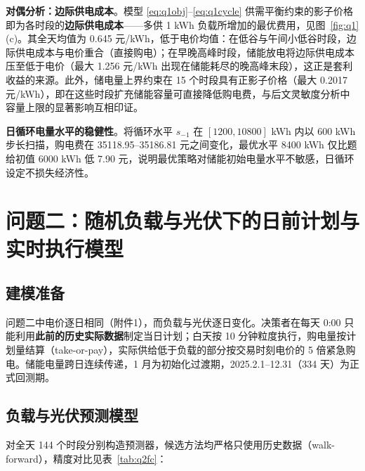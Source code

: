\documentclass[zihao=-4,a4paper,UTF8,fontset=none]{ctexart}
\begin{document}
\textbf{对偶分析：边际供电成本}。模型 \eqref{eq:q1obj}--\eqref{eq:q1cycle} 供需平衡约束的影子价格即为各时段的\textbf{边际供电成本}——多供 1 kWh 负载所增加的最优费用，见图~\ref{fig:q1}(c)。其全天均值为 0.645 元/kWh，低于电价均值：在低谷与午间小低谷时段，边际供电成本与电价重合（直接购电）；在早晚高峰时段，储能放电将边际供电成本压至低于电价（最大 1.256 元/kWh 出现在储能耗尽的晚高峰末段），这正是套利收益的来源。此外，储电量上界约束在 15 个时段具有正影子价格（最大 0.2017 元/kWh），即在这些时段扩充储能容量可直接降低购电费，与后文灵敏度分析中容量上限的显著影响互相印证。

\textbf{日循环电量水平的稳健性}。将循环水平 $s_{-1}$ 在 $[1200,10800]$ kWh 内以 600 kWh 步长扫描，购电费在 35118.95--35186.81 元之间变化，最优水平 8400 kWh 仅比题给初值 6000 kWh 低 7.90 元，说明最优策略对储能初始电量水平不敏感，日循环设定不损失经济性。


\section{问题二：随机负载与光伏下的日前计划与实时执行模型}

\subsection{建模准备}

问题二中电价逐日相同（附件1），而负载与光伏逐日变化。决策者在每天 0:00 只能利用\textbf{此前的历史实际数据}制定当日计划；白天按 10 分钟粒度执行，购电量按计划量结算（take-or-pay），实际供给低于负载的部分按交易时刻电价的 5 倍紧急购电。储能电量跨日连续传递，1 月为初始化过渡期，2025.2.1--12.31（334 天）为正式回测期。

\subsection{负载与光伏预测模型}

对全天 144 个时段分别构造预测器，候选方法均严格只使用历史数据（walk-forward），精度对比见表~\ref{tab:q2fc}：
\end{document}
